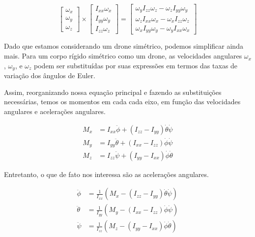 \begin{equation}
\begin{bmatrix}
\omega_x \\
\omega_y \\
\omega_z
\end{bmatrix}
\times
\begin{bmatrix}
I_{xx} \omega_x \\
I_{yy} \omega_y \\
I_{zz} \omega_z
\end{bmatrix}
=
\begin{bmatrix}
\omega_y I_{zz} \omega_z - \omega_z I_{yy} \omega_y \\
\omega_z I_{xx} \omega_x - \omega_x I_{zz} \omega_z \\
\omega_x I_{yy} \omega_y - \omega_y I_{xx} \omega_x
\end{bmatrix}
\end{equation}

Dado que estamos considerando um drone simétrico, podemos simplificar ainda mais. Para um corpo rígido simétrico como um drone, as velocidades angulares 
$\omega_x$, $\omega_y$, e $\omega_z$ podem ser substituídas por suas expressões em termos das taxas de variação dos ângulos de Euler.

Assim, reorganizando nossa equação principal e fazendo as substituições necessárias, temos os momentos em cada cada eixo, em função das velocidades angulares e acelerações angulares. 

\begin{align*}
	M_x &= I_{xx} \ddot{\phi} + (I_{zz} - I_{yy}) \dot{\theta} \dot{\psi} \\
	M_y &= I_{yy} \ddot{\theta} + (I_{xx} - I_{zz}) \dot{\phi} \dot{\psi} \\
	M_z &= I_{zz} \ddot{\psi} + (I_{yy} - I_{xx}) \dot{\phi} \dot{\theta}
\end{align*}

Entretanto, o que de fato nos interessa são as acelerações angulares.

\begin{align*}
	\ddot{\phi} &= \frac{1}{I_{xx}} \left( M_x - (I_{zz} - I_{yy}) \dot{\theta} \dot{\psi} \right) \\
	\ddot{\theta} &= \frac{1}{I_{yy}} \left( M_y - (I_{xx} - I_{zz}) \dot{\phi} \dot{\psi} \right) \\
	\ddot{\psi} &= \frac{1}{I_{zz}} \left( M_z - (I_{yy} - I_{xx}) \dot{\phi} \dot{\theta} \right)
\end{align*}

